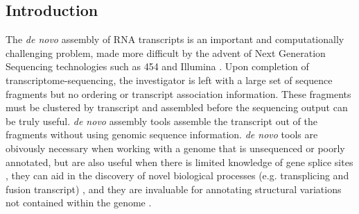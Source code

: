 \documentclass[10pt]{bmc_article}
\newenvironment{bmcformat}{\begin{raggedright}\baselineskip20pt\sloppy\setboolean{publ}{false}}{\end{raggedright}\baselineskip20pt\sloppy}
\begin{document}
\begin{bmcformat}
\begin{abstract}
\end{abstract}









  \section*{Introduction}

  The {\it de novo} assembly of RNA transcripts is an important and
  computationally challenging problem, made more difficult by the
  advent of Next Generation Sequencing technologies such as 454 and
  Illumina \cite{Nagaraj07,Rao10}.  Upon completion of
  transcriptome-sequencing, the investigator is left with a large set
  of sequence fragments but no ordering or transcript association
  information.  These fragments must be clustered by transcript and
  assembled before the sequencing output can be truly useful.  {\it de
    novo} assembly tools assemble the transcript out of the fragments
  without using genomic sequence information.  {\it de novo} tools are
  obivously necessary when working with a genome that is unsequenced
  or poorly annotated, but are also useful when there is limited
  knowledge of gene splice sites \cite{Birol09,Robertson10}, they can
  aid in the discovery of novel biological processes
  (e.g. transplicing and fusion transcript) \cite{Mitelman07,Li10b}, and
    they are invaluable for annotating structural variations not
    contained within the genome \cite{Li08}.




\end{bmcformat}
\end{document}

